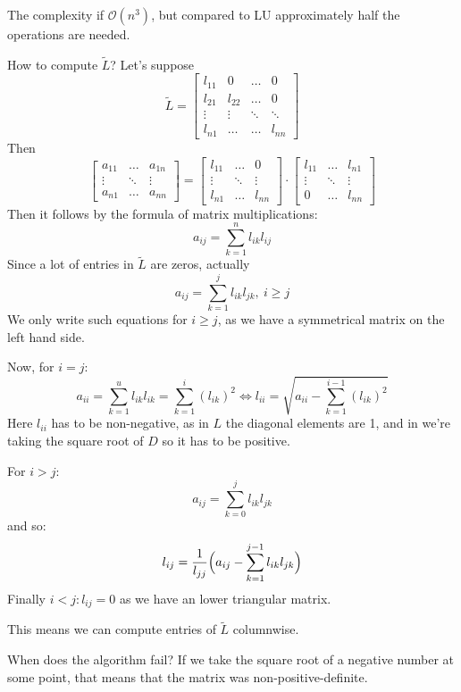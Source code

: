 The complexity if $\mathcal{O}(n^3)$, but compared to LU approximately half the operations
are needed.

How to compute $\widetilde{L}$? Let's suppose
\[
    \tilde{L} = \begin{bmatrix}
        l_{11} & 0 & \dots & 0\\
        l_{21}  & l_{22} & \dots & 0\\
        \vdots & \vdots & \ddots & \ddots\\
        l_{n1} & \dots & \dots & l_{nn}
    \end{bmatrix}
\] 
Then
\[
    \begin{bmatrix}
        a_{11} & \dots & a_{1n}\\
        \vdots & \ddots & \vdots\\
        a_{n1} & \dots & a_{nn}
    \end{bmatrix} =
    \begin{bmatrix}
        l_{11} & \dots & 0\\
        \vdots & \ddots & \vdots\\
        l_{n1} & \dots & l_{nn}
    \end{bmatrix} \cdot
    \begin{bmatrix}
        l_{11} & \dots & l_{n1}\\
        \vdots & \ddots & \vdots\\
        0 & \dots & l_{nn}
    \end{bmatrix}
\]
Then it follows by the formula of matrix multiplications:
\[ a_{ij} = \sum_{k=1}^n l_{ik} l_{ij} \]
Since a lot of entries in $\tilde{L}$ are zeros, actually
\[ a_{ij} = \sum_{k = 1}^j l_{ik} l_{jk},\ i \ge j \]
We only write such equations for $i \ge j$, as we have a symmetrical matrix
on the left hand side.

Now, for $i = j$:
\[
    a_{ii} = \sum_{k=1}^{u} l_{ik} l_{ik} = \sum_{k=1}^i (l_{ik})^2
    \Longleftrightarrow l_{ii} = \sqrt{a_{ii} - \sum_{k=1}^{i-1} (l_{ik})^2}
\]
Here $l_{ii}$ has to be non-negative, as in $L$ the diagonal elements are 1,
and in we're taking the square root of $D$ so it has to be positive.

For $i > j$: \[ a_{ij} = \sum_{k=0}^j l_{ik} l_{jk} \]
and so:
\[ l_{ij} = \frac{1}{l_{jj}} \Bigl(a_{ij} - \sum_{k=1}^{j-1} l_{ik} l_{jk}\Bigr) \]
Finally $i < j: l_{ij} = 0$ as we have an lower triangular matrix.

This means we can compute entries of $\tilde{L}$ columnwise.

When does the algorithm fail? If we take the square root of a negative number
at some point, that means that the matrix was non-positive-definite.

